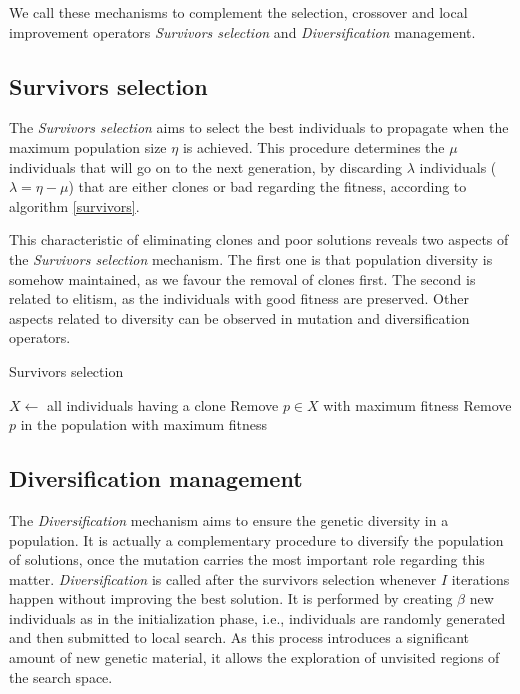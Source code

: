 We call these mechanisms to complement the selection, crossover and local improvement operators \textit{Survivors selection} and \textit{Diversification} management.

\subsection{Survivors selection}
The \textit{Survivors selection} aims to select the best individuals to propagate when the maximum population size $\eta$ is achieved. This procedure determines the $\mu$ individuals that will go on to the next generation, by discarding $\lambda$ individuals ($\lambda = \eta - \mu$) that are either clones or bad regarding the fitness, according to algorithm \ref{survivors}.

This characteristic of eliminating clones and poor solutions reveals two aspects of the \textit{Survivors selection} mechanism. The first one is that population diversity is somehow maintained, as we favour the removal of clones first. The second is related to elitism, as the individuals with good fitness are preserved. Other aspects related to diversity can be observed in mutation and diversification operators.

\begin{algorithm}[H]
\caption{Survivors selection}
\label{survivors}
\begin{algorithmic}[1]
\STATE $X \leftarrow $ all individuals having a clone
\STATE Remove $p \in X$ with maximum fitness
\ELSE
\STATE Remove $p$ in the population with maximum fitness
\ENDIF
\ENDFOR
\end{algorithmic}
\end{algorithm}

\subsection{Diversification management}
The \textit{Diversification} mechanism aims to ensure the genetic diversity in a population. It is actually a complementary procedure to diversify the population of solutions, once the mutation carries the most important role regarding this matter. \textit{Diversification} is called after the survivors selection whenever $I$ iterations happen without improving the best solution. It is performed by creating $\beta$ new individuals as in the initialization phase, i.e., individuals are randomly generated and then submitted to local search. As this process introduces a significant amount of new genetic material, it allows the exploration of unvisited regions of the search space.

